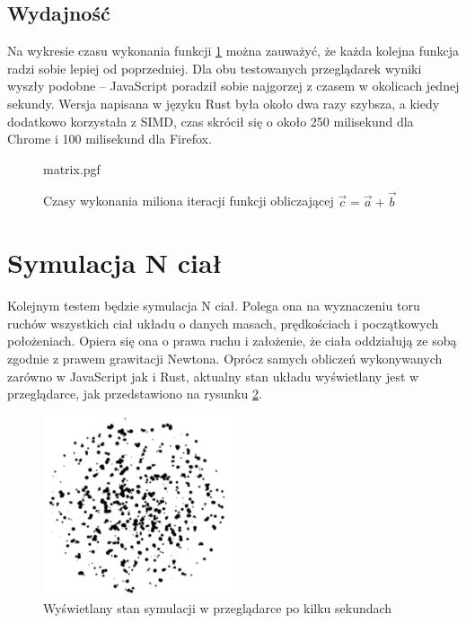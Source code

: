 \documentclass[language=polish,type=master]{aghmodern}
\begin{document}
\subsection{Wydajność}
Na wykresie czasu wykonania funkcji \ref{fig:matrix} można zauważyć, że każda kolejna funkcja radzi sobie lepiej od poprzedniej.
Dla obu testowanych przeglądarek wyniki wyszły podobne -- JavaScript poradził sobie najgorzej z czasem w okolicach jednej sekundy.
Wersja napisana w języku Rust była około dwa razy szybsza, a kiedy dodatkowo korzystała z SIMD, czas skrócił się o około 250 milisekund dla Chrome i 100 milisekund dla Firefox.

\begin{figure}[H]
    \centering
    {matrix.pgf}
    \caption{Czasy wykonania miliona iteracji funkcji obliczającej $\vec{c} = \vec{a} + \vec{b}$}
    \label{fig:matrix}
\end{figure}

\section{Symulacja N ciał}
Kolejnym testem będzie symulacja N ciał.
Polega ona na wyznaczeniu toru ruchów wszystkich ciał układu o danych masach, prędkościach i początkowych położeniach.
Opiera się ona o prawa ruchu i założenie, że ciała oddziałują ze sobą zgodnie z prawem grawitacji Newtona.
Oprócz samych obliczeń wykonywanych zarówno w JavaScript jak i Rust, aktualny stan układu wyświetlany jest w przeglądarce, jak przedstawiono na rysunku \ref{fig:nbody_screenshot}.

\begin{figure}[H]
    \centering
    \vspace*{60pt}
    \includegraphics[width=0.5\textwidth]{images/nbody.pdf}
    \vspace*{15pt}
    \caption{Wyświetlany stan symulacji w przeglądarce po kilku sekundach}
    \label{fig:nbody_screenshot}
\end{figure}
\end{document}
